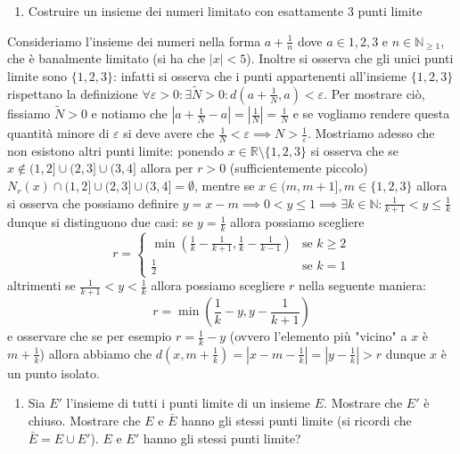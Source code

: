\documentclass{report}
\begin{document}
\begin{enumerate}[resume, label=\protect\circled{\arabic*}]
	\item Costruire un insieme dei numeri limitato con esattamente 3 punti limite
\end{enumerate}
\begin{mysolution}
	Consideriamo l'insieme dei numeri nella forma $a+\frac{1}{n}$ dove $a \in {1,2,3}$ e $n \in \mathbb{N}_{\geq 1}$, che è banalmente limitato (si ha che $|x| < 5$). Inoltre si osserva che gli unici punti limite sono $\{ 1, 2, 3 \}$: infatti si osserva che i punti appartenenti all'insieme $\{ 1, 2, 3 \} $ rispettano la definizione $\forall \varepsilon > 0: \exists \tilde{N} > 0: d(a + \frac{1}{N}, a) < \varepsilon$. Per mostrare ciò, fissiamo $\tilde{N} > 0$ e notiamo che $|a + \frac{1}{N} - a| = |\frac{1}{N}| = \frac{1}{N}$ e se vogliamo rendere questa quantità minore di $\varepsilon$ si deve avere che $\frac{1}{N} < \varepsilon \implies N > \frac{1}{\varepsilon}$. Mostriamo adesso che non esistono altri punti limite: ponendo $x \in \mathbb{R} \setminus \{ 1, 2, 3 \}$ si osserva che se $x \not\in (1, 2] \cup (2, 3] \cup (3, 4]$ allora per $r>0$ (sufficientemente piccolo) $N_r(x) \cap (1, 2] \cup (2, 3] \cup (3, 4] = \emptyset$, mentre se $x \in (m, m+1], m \in \{1, 2, 3\}$ allora si osserva che possiamo definire $y=x-m \implies 0<y \leq 1 \implies \exists k \in \mathbb{N}: \frac{1}{k+1} < y \leq \frac{1}{k}$ dunque si distinguono due casi: se $y=\frac{1}{k}$ allora possiamo scegliere
	\begin{equation*}
		r = \begin{cases} \min{ \left( \frac{1}{k} - \frac{1}{k+1}, \frac{1}{k} - \frac{1}{k-1} \right)}	 & \text{se } k \geq 2 \\ 
		\frac{1}{2} & \text{se } k=1		
		\end{cases}
	\end{equation*}
altrimenti se $\frac{1}{k+1} < y < \frac{1}{k}$ allora possiamo scegliere $r$ nella seguente maniera:
	\begin{equation*}
		r = \min{\left( \frac{1}{k} - y, y-\frac{1}{k+1} \right)}
	\end{equation*}
	e osservare che se per esempio $r = \frac{1}{k} - y$ (ovvero l'elemento più "vicino" a $x$ è $m + \frac{1}{k}$) allora abbiamo che $d(x, m + \frac{1}{k}) = |x - m - \frac{1}{k}| = |y - \frac{1}{k}| > r$ dunque $x$ è un punto isolato.
\end{mysolution}
\begin{enumerate}[resume, label=\protect\circled{\arabic*}]
	\item Sia $E'$ l'insieme di tutti i punti limite di un insieme $E$. Mostrare che $E'$ è chiuso. Mostrare che $E$ e $\bar{E}$ hanno gli stessi punti limite (si ricordi che $\bar{E} = E \cup E'$). $E$ e $E'$ hanno gli stessi punti limite?
\end{enumerate}
\end{document}
